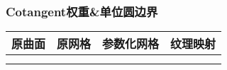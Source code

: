 \documentclass[14pt]{scrartcl} %
\begin{document}
	
	\pagebreak
	\subsubsection{Cotangent权重\&单位圆边界}
	\begin{table}[h] %
		\centering %
		\begin{tabular}{l l l l}
			\toprule
			\centering
			\textbf{原曲面} & \textbf{原网格} & \textbf{参数化网格} &\textbf{纹理映射}\\
			\midrule
			\begin{minipage}[t]{0.2\linewidth}
				\centering
			\end{minipage}&
			\begin{minipage}[t]{0.2\linewidth}
				\centering
			\end{minipage}&
			\begin{minipage}[t]{0.2\linewidth}
				\centering
			\end{minipage}&
			\begin{minipage}[t]{0.2\linewidth}
				\centering
			\end{minipage}\\
			\begin{minipage}[t]{0.2\linewidth}
				\centering
			\end{minipage}&
			\begin{minipage}[t]{0.2\linewidth}
				\centering
			\end{minipage}&
			\begin{minipage}[t]{0.2\linewidth}
				\centering
			\end{minipage}&
			\begin{minipage}[t]{0.2\linewidth}
				\centering
			\end{minipage}\\
			

\end{tabular}
\end{table}
\end{document}
